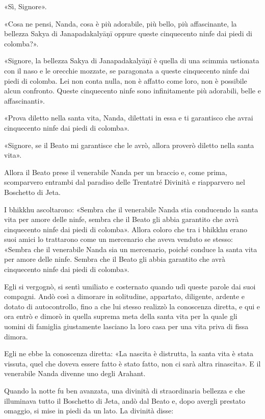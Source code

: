 «Sì, Signore».

«Cosa ne pensi, Nanda, cosa è più adorabile, più bello, più affascinante, la
bellezza Sakya di Janapadakalyāṇī oppure queste cinquecento ninfe dai piedi di
colomba?».

«Signore, la bellezza Sakya di Janapadakalyāṇī è quella di una scimmia ustionata
con il naso e le orecchie mozzate, se paragonata a queste cinquecento ninfe dai
piedi di colomba. Lei non conta nulla, non è affatto come loro, non è possibile
alcun confronto. Queste cinquecento ninfe sono infinitamente più adorabili,
belle e affascinanti».

«Prova diletto nella santa vita, Nanda, dilettati in essa e ti garantisco che
avrai cinquecento ninfe dai piedi di colomba».

«Signore, se il Beato mi garantisce che le avrò, allora proverò diletto nella
santa vita».

Allora il Beato prese il venerabile Nanda per un braccio e, come prima,
scomparvero entrambi dal paradiso delle Trentatré Divinità e riapparvero nel
Boschetto di Jeta.

I bhikkhu ascoltarono: «Sembra che il venerabile Nanda stia conducendo la santa
vita per amore delle ninfe, sembra che il Beato gli abbia garantito che avrà
cinquecento ninfe dai piedi di colomba». Allora coloro che tra i bhikkhu erano
suoi amici lo trattarono come un mercenario che aveva venduto se stesso: «Sembra
che il venerabile Nanda sia un mercenario, poiché conduce la santa vita per
amore delle ninfe. Sembra che il Beato gli abbia garantito che avrà cinquecento
ninfe dai piedi di colomba».

Egli si vergognò, si sentì umiliato e costernato quando udì queste parole dai
suoi compagni. Andò così a dimorare in solitudine, appartato, diligente, ardente
e dotato di autocontrollo, fino a che lui stesso realizzò la conoscenza diretta,
e qui e ora entrò e dimorò in quella suprema meta della santa vita per la quale
gli uomini di famiglia giustamente lasciano la loro casa per una vita priva di
fissa dimora.

Egli ne ebbe la conoscenza diretta: «La nascita è distrutta, la santa vita è
stata vissuta, quel che doveva essere fatto è stato fatto, non ci sarà altra
rinascita». E il venerabile Nanda divenne uno degli Arahant.

Quando la notte fu ben avanzata, una divinità di straordinaria bellezza e che
illuminava tutto il Boschetto di Jeta, andò dal Beato e, dopo avergli prestato
omaggio, si mise in piedi da un lato. La divinità disse:

